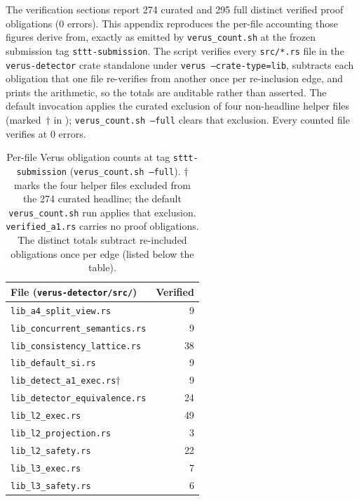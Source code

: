 \documentclass[journal,compsoc,10pt]{IEEEtran}
\theoremstyle{definition}
\theoremstyle{remark}
\begin{document}
The verification sections report 274 curated and 295 full distinct verified
proof obligations (0 errors). This appendix reproduces the per-file accounting
those figures derive from, exactly as emitted by \texttt{verus\_count.sh} at
the frozen submission tag \texttt{sttt-submission}. The script verifies every
\texttt{src/*.rs} file in the \texttt{verus-detector} crate standalone under
\texttt{verus --crate-type=lib}, subtracts each obligation that one file
re-verifies from another once per re-inclusion edge, and prints the
arithmetic, so the totals are auditable rather than asserted. The default
invocation applies the curated exclusion of four non-headline helper files
(marked~$\dagger$ in ); \texttt{verus\_count.sh --full}
clears that exclusion. Every counted file verifies at 0 errors.

\begin{table}[t]
\centering
\footnotesize
\caption{Per-file Verus obligation counts at tag \texttt{sttt-submission}
(\texttt{verus\_count.sh --full}). $\dagger$ marks the four helper files
excluded from the 274 curated headline; the default \texttt{verus\_count.sh}
run applies that exclusion. \texttt{verified\_a1.rs} carries no proof
obligations. The distinct totals subtract re-included obligations once per
edge (listed below the table).}
\label{tab:obligations}
\begin{tabular}{@{}lr@{}}
\toprule
File (\texttt{verus-detector/src/}) & Verified \\
\midrule
\texttt{lib\_a4\_split\_view.rs}                 & 9  \\
\texttt{lib\_concurrent\_semantics.rs}           & 9  \\
\texttt{lib\_consistency\_lattice.rs}            & 38 \\
\texttt{lib\_default\_si.rs}                     & 9  \\
\texttt{lib\_detect\_a1\_exec.rs}$\dagger$       & 9  \\
\texttt{lib\_detector\_equivalence.rs}           & 24 \\
\texttt{lib\_l2\_exec.rs}                        & 49 \\
\texttt{lib\_l2\_projection.rs}                  & 3  \\
\texttt{lib\_l2\_safety.rs}                      & 22 \\
\texttt{lib\_l3\_exec.rs}                        & 7  \\
\texttt{lib\_l3\_safety.rs}                      & 6  \\

\end{tabular}
\end{table}
\end{document}
